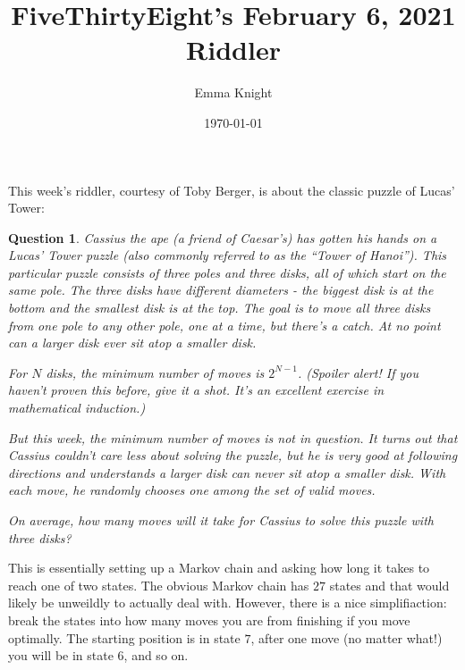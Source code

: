 \documentclass[11pt]{article}
\title{FiveThirtyEight's February 6, 2021 Riddler}
\author{Emma Knight}
\date{\today}
\newtheorem{question}[theorem]{Question}
\theoremstyle{definition}
\begin{document}
\maketitle
This week's riddler, courtesy of Toby Berger, is about the classic puzzle of Lucas' Tower:
\begin{question}
Cassius the ape (a friend of Caesar’s) has gotten his hands on a Lucas’ Tower puzzle (also commonly referred to as the ``Tower of Hanoi''). This particular puzzle consists of three poles and three disks, all of which start on the same pole. The three disks have different diameters - the biggest disk is at the bottom and the smallest disk is at the top. The goal is to move all three disks from one pole to any other pole, one at a time, but there’s a catch. At no point can a larger disk ever sit atop a smaller disk.

For $N$ disks, the minimum number of moves is $2^{N-1}$. (Spoiler alert! If you haven’t proven this before, give it a shot. It’s an excellent exercise in mathematical induction.)

But this week, the minimum number of moves is not in question. It turns out that Cassius couldn’t care less about solving the puzzle, but he is very good at following directions and understands a larger disk can never sit atop a smaller disk. With each move, he randomly chooses one among the set of valid moves.

On average, how many moves will it take for Cassius to solve this puzzle with three disks?
\end{question}
This is essentially setting up a Markov chain and asking how long it takes to reach one of two states.  The obvious Markov chain has $27$ states and that would likely be unweildly to actually deal with.  However, there is a nice simplifiaction: break the states into how many moves you are from finishing if you move optimally.  The starting position is in state $7$, after one move (no matter what!) you will be in state $6$, and so on.
\end{document}
